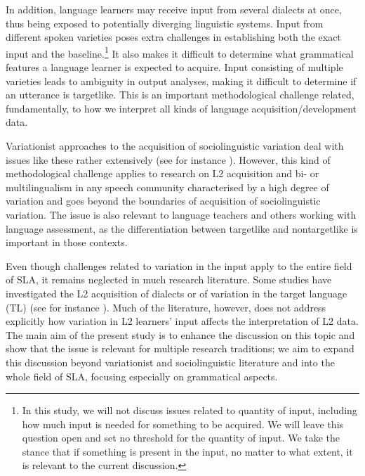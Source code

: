 \documentclass[output=paper,colorlinks,citecolor=brown,modfonts,nonflat]{../langscibook}
\begin{document}
In addition, language learners may receive input from several dialects at once, thus being exposed to potentially diverging linguistic systems. Input from different spoken varieties poses extra challenges in establishing both the exact input and the baseline.\footnote{{In this study, we will not discuss issues related to quantity of input, including how much input is needed for something to be acquired. We will leave this question open and set no threshold for the quantity of input. We take the stance that if something is present in the input, no matter to what extent, it is relevant to the current discussion.}} It also makes it difficult to determine what grammatical features a language learner is expected to acquire. Input consisting of multiple varieties leads to ambiguity in output analyses, making it difficult to determine if an utterance is targetlike. This is an important methodological challenge related, fundamentally, to how we interpret all kinds of language acquisition/development data.


Variationist approaches to the acquisition of sociolinguistic variation deal with issues like these rather extensively (see for instance \citealt{Geeslin2011}). However, this kind of methodological challenge applies to research on L2 acquisition and bi- or multilingualism in any speech community characterised by a high degree of variation and goes beyond the boundaries of acquisition of sociolinguistic variation. The issue is also relevant to language teachers and others working with language assessment, as the differentiation between targetlike and nontargetlike is important in those contexts. 



Even though challenges related to variation in the input apply to the entire field of SLA, it remains neglected in much research literature. Some studies have investigated the L2 acquisition of dialects or of variation in the target language (TL) (see for instance \citealt{GeeslinGudmestad2008,Schmidt2011,GeeslinEtAl2012,RodinaWestergaard2015Bilingualism}). Much of the literature, however, does not address explicitly how variation in L2 learners’ input affects the interpretation of L2 data. The main aim of the present study is to enhance the discussion on this topic and show that the issue is relevant for multiple research traditions; we aim to expand this discussion beyond variationist and sociolinguistic literature and into the whole field of SLA, focusing especially on grammatical aspects.
\end{document}
